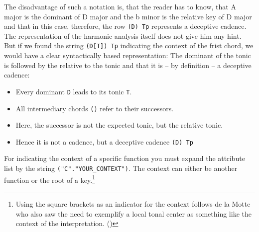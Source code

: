 \documentclass[
  DIV=calc,
  BCOR=5mm,
  12pt,
  headings=small,
  oneside,
  abstract=true,
  toc=bib,
  xcolor=dvipsnames,
  openany,
  ngerman,english]{scrartcl}
\begin{document}
\begin{center}
\end{center}

The disadvantage of such a notation is, that the reader has to know, that A
major is the dominant of D major and the b minor is the relative key of D major
and that in this case, therefore, the row \texttt{(D) Tp} represents a deceptive
cadence. The representation of the harmonic analysis itself does not give him
any hint. But if we found the string \texttt{(D[T]) Tp} indicating the context
of the frist chord, we would have a clear syntactically based representation:
The dominant of the tonic is followed by the relative to the tonic and that it
is -- by definition -- a deceptive cadence:

\begin{center}
\end{center}

\begin{itemize}
  \item Every dominant \texttt{D} leads to its tonic \texttt{T}.
  \item All intermediary chords \texttt{()} refer to their successors.
  \item Here, the successor is not the expected tonic, but the relative tonic.
  \item Hence it is not a cadence, but a deceptive cadence \texttt{(D) Tp}
\end{itemize}

For indicating the context of a specific function you must expand the attribute
list by the string \texttt{("C"."YOUR\_CONTEXT")}. The context can either be
another function or the root of a key.\footnote{Using the square brackets as an 
indicator for the context follows de la Motte who also saw the need to exemplify
a local tonal center as something like the context of the interpretation.
(\cite[cf.][144 et passim]{Delamotte2011a})}
\end{document}
